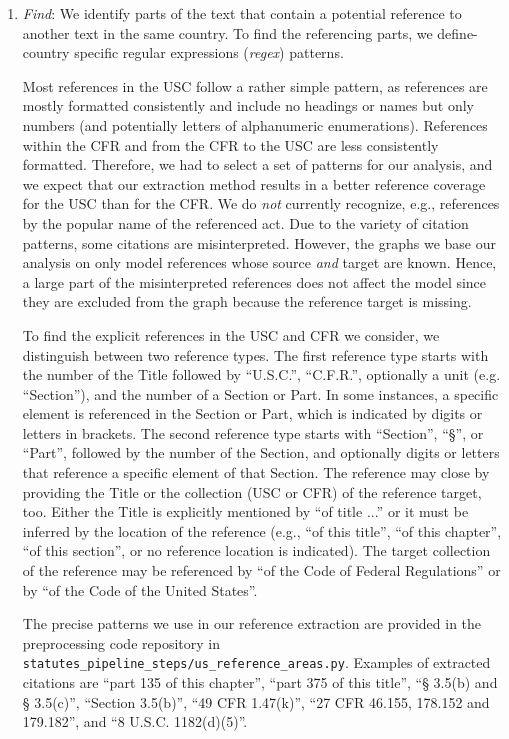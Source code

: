 \documentclass[utf8,sort&compress,numbers,square,table,hidelinks]{frontiers_suppmat} %
\begin{document}
\begin{enumerate}
	
	\item \emph{Find}: We identify parts of the text that contain a potential reference to another text in the same country.
	To find the referencing parts, we define-country specific regular expressions (\emph{regex}) patterns. 

	Most references in the USC follow a rather simple pattern,
	as references are mostly formatted consistently and include no headings or names but only numbers (and potentially letters of alphanumeric enumerations).
	References within the CFR and from the CFR to the USC are less consistently formatted. 
	Therefore, we had to select a set of patterns for our analysis, 
	and we expect that our extraction method results in a better reference coverage for the USC than for the CFR.
	We do \emph{not} currently recognize, e.g., references by the popular name of the referenced act.
	Due to the variety of citation patterns, some citations are misinterpreted. However, the graphs we base our analysis on only model references whose source \emph{and} target are known.
	Hence, a large part of the misinterpreted references does not affect the model since they are excluded from the graph because the reference target is missing.

	To find the explicit references in the USC and CFR we consider, we distinguish between two reference types.
	The first reference type starts with the number of the Title followed by ``U.S.C.'', ``C.F.R.'', optionally a unit (e.g. ``Section''), and the number of a Section or Part. 
	In some instances, a specific element is referenced in the Section or Part, which is indicated by digits or letters in brackets.
	The second reference type starts with ``Section'', ``§'', or ``Part'', followed by the number of the Section, and optionally digits or letters that reference a specific element of that Section.
	The reference may close by providing the Title or the collection (USC or CFR) of the reference target, too. 
	Either the Title is explicitly mentioned by ``of title ...'' or it must be inferred by the location of the reference (e.g., ``of this title'', ``of this chapter'', ``of this section'', or no reference location is indicated).
	The target collection of the reference may be referenced by ``of the Code of Federal Regulations'' or by ``of the Code of the United States''.

	The precise patterns we use in our reference extraction are provided in the preprocessing code repository in \texttt{statutes\_pipeline\_steps/us\_reference\_areas.py}.
	Examples of extracted citations are
	``part 135 of this chapter'',
	``part 375 of this title'',
	``§ 3.5(b) and § 3.5(c)'',
	``Section 3.5(b)'',
	``49 CFR 1.47(k)'',
	``27 CFR 46.155, 178.152 and 179.182'', and
	``8 U.S.C. 1182(d)(5)''.


\end{enumerate}
\end{document}
